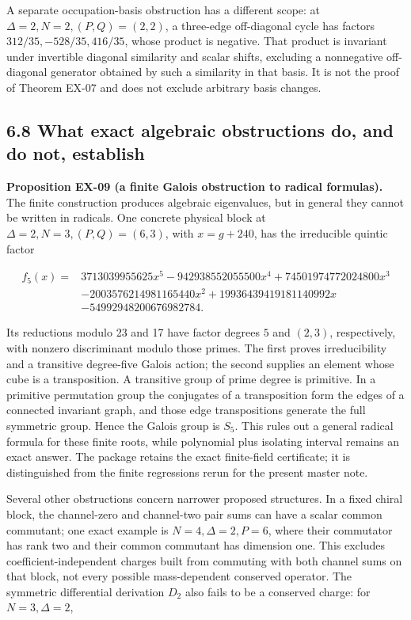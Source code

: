 \documentclass[a4paper,11pt]{article}
\numberwithin{equation}{section}
\begin{document}
A separate occupation-basis obstruction has a different scope: at \(\Delta=2,N=2,(P,Q)=(2,2)\), a three-edge off-diagonal cycle has factors \(312/35,-528/35,416/35\), whose product is negative. That product is invariant under invertible diagonal similarity and scalar shifts, excluding a nonnegative off-diagonal generator obtained by such a similarity in that basis. It is not the proof of Theorem EX-07 and does not exclude arbitrary basis changes.

\hypertarget{what-exact-algebraic-obstructions-do-and-do-not-establish}{%
\subsection{6.8 What exact algebraic obstructions do, and do not, establish}\label{what-exact-algebraic-obstructions-do-and-do-not-establish}}

\textbf{Proposition EX-09 (a finite Galois obstruction to radical formulas).} The finite construction produces algebraic eigenvalues, but in general they cannot be written in radicals. One concrete physical block at \(\Delta=2,N=3,(P,Q)=(6,3)\), with \(x=g+240\), has the irreducible quintic factor

\[
\begin{aligned}
f_5(x)={}&3713039955625x^5-942938552055500x^4
+74501974772024800x^3\\
&-2003576214981165440x^2
+19936439419181140992x\\
&-54992948200676982784.
\end{aligned}
\tag{6.56}
\]

Its reductions modulo 23 and 17 have factor degrees \(5\) and \((2,3)\), respectively, with nonzero discriminant modulo those primes. The first proves irreducibility and a transitive degree-five Galois action; the second supplies an element whose cube is a transposition. A transitive group of prime degree is primitive. In a primitive permutation group the conjugates of a transposition form the edges of a connected invariant graph, and those edge transpositions generate the full symmetric group. Hence the Galois group is \(S_5\). This rules out a general radical formula for these finite roots, while polynomial plus isolating interval remains an exact answer. The package retains the exact finite-field certificate; it is distinguished from the finite regressions rerun for the present master note.

Several other obstructions concern narrower proposed structures. In a fixed chiral block, the channel-zero and channel-two pair sums can have a scalar common commutant; one exact example is \(N=4,\Delta=2,P=6\), where their commutator has rank two and their common commutant has dimension one. This excludes coefficient-independent charges built from commuting with both channel sums on that block, not every possible mass-dependent conserved operator. The symmetric differential derivation \(D_2\) also fails to be a conserved charge: for \(N=3,\Delta=2\),
\end{document}
